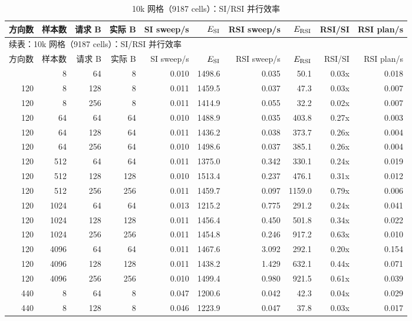 {\tiny\setlength{\tabcolsep}{2.3pt}
\begin{longtable}{rrrrrrrrrr}
\caption{10k 网格（9187 cells）：SI/RSI 并行效率}\label{tab:factor-efficiency-10k}\\
\toprule
方向数 & 样本数 & 请求 B & 实际 B & SI sweep/s & $E_{\rm SI}$ & RSI sweep/s & $E_{\rm RSI}$ & RSI/SI & RSI plan/s\\
\midrule
\endfirsthead
\multicolumn{10}{l}{\small 续表：10k 网格（9187 cells）：SI/RSI 并行效率}\\
\toprule
方向数 & 样本数 & 请求 B & 实际 B & SI sweep/s & $E_{\rm SI}$ & RSI sweep/s & $E_{\rm RSI}$ & RSI/SI & RSI plan/s\\
\midrule
\endhead
\bottomrule
\endfoot
120 & 8 & 64 & 8 & 0.010 & 1498.6 & 0.035 & 50.1 & 0.03x & 0.018\\
120 & 8 & 128 & 8 & 0.011 & 1459.5 & 0.037 & 47.3 & 0.03x & 0.007\\
120 & 8 & 256 & 8 & 0.011 & 1414.9 & 0.055 & 32.2 & 0.02x & 0.007\\
120 & 64 & 64 & 64 & 0.010 & 1488.9 & 0.035 & 403.8 & 0.27x & 0.003\\
120 & 64 & 128 & 64 & 0.011 & 1436.2 & 0.038 & 373.7 & 0.26x & 0.004\\
120 & 64 & 256 & 64 & 0.010 & 1498.6 & 0.037 & 385.1 & 0.26x & 0.004\\
120 & 512 & 64 & 64 & 0.011 & 1375.0 & 0.342 & 330.1 & 0.24x & 0.019\\
120 & 512 & 128 & 128 & 0.010 & 1513.4 & 0.237 & 476.1 & 0.31x & 0.012\\
120 & 512 & 256 & 256 & 0.011 & 1459.7 & 0.097 & 1159.0 & 0.79x & 0.006\\
120 & 1024 & 64 & 64 & 0.013 & 1215.2 & 0.775 & 291.2 & 0.24x & 0.041\\
120 & 1024 & 128 & 128 & 0.011 & 1456.4 & 0.450 & 501.8 & 0.34x & 0.022\\
120 & 1024 & 256 & 256 & 0.011 & 1454.8 & 0.246 & 917.2 & 0.63x & 0.010\\
120 & 4096 & 64 & 64 & 0.011 & 1467.6 & 3.092 & 292.1 & 0.20x & 0.154\\
120 & 4096 & 128 & 128 & 0.011 & 1438.2 & 1.429 & 632.1 & 0.44x & 0.071\\
120 & 4096 & 256 & 256 & 0.010 & 1499.4 & 0.980 & 921.5 & 0.61x & 0.039\\
440 & 8 & 64 & 8 & 0.047 & 1200.6 & 0.042 & 42.3 & 0.04x & 0.029\\
440 & 8 & 128 & 8 & 0.046 & 1223.9 & 0.047 & 37.8 & 0.03x & 0.017\\

\end{longtable}}
